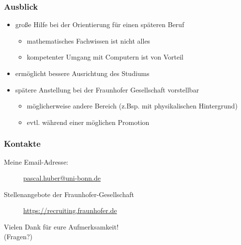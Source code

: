 \begin{frame} \frametitle{Ausblick}
  \begin{itemize}
  \item gro\ss e Hilfe bei der Orientierung f\"ur einen sp\"ateren Beruf
    \begin{itemize}
    \item mathematisches Fachwissen ist nicht alles
    \item kompetenter Umgang mit Computern ist von Vorteil
    \end{itemize}
  \item erm\"oglicht bessere Ausrichtung des Studiums
  \item sp\"atere Anstellung bei der Fraunhofer Gesellschaft vorstellbar
    \begin{itemize}
    \item m\"oglicherweise andere Bereich (z.Bsp. mit physikalischen Hintergrund)
    \item evtl. w\"ahrend einer m\"oglichen Promotion
    \end{itemize}
  \end{itemize}
\end{frame}

\begin{frame} \frametitle{Kontakte}
  \begin{description}
  \item[Meine Email-Adresse: \hspace{2cm}] 
    \url{pascal.huber@uni-bonn.de}
  \item[Stellenangebote der Fraunhofer-Gesellschaft] \url{https://recruiting.fraunhofer.de}
  \end{description}
\end{frame}

\begin{frame}[c]
  \begin{center}
    \huge{Vielen Dank f\"ur eure Aufmerksamkeit!} \\
    \vspace{1cm}
    \large{(Fragen?)}
  \end{center}
\end{frame}


